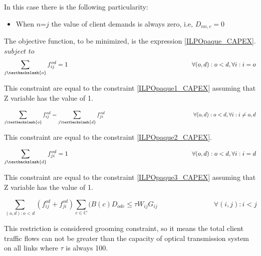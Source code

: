 \vspace{11pt}
In this case there is the following particularity:

\begin{itemize}
  \item When $n$=$j$ the value of client demands is always zero, i.e, $D_{nn,c}=0$
\end{itemize}


\vspace{17pt}
The objective function, to be minimized, is the expression \ref{ILPOpaque_CAPEX}.\\

$subject$ $to$
\begin{equation}
\sum_{j\textbackslash \{o\}} f_{ij}^{od} = 1  \qquad \qquad \qquad \qquad \qquad \qquad \qquad \qquad \qquad \qquad
\forall(o,d) : o < d, \forall i: i = o
\label{ILPOpaque1_Surv}
\end{equation}

This constraint are equal to the constraint \ref{ILPOpaque1_CAPEX} assuming that Z variable has the value of 1.

\begin{equation}
\sum_{j\textbackslash \{o\}} f_{ij}^{od} = \sum_{j\textbackslash \{d\}} f_{ji}^{od}   \qquad \qquad \qquad \qquad \qquad \qquad \qquad \qquad
\forall(o,d) : o < d, \forall i: i \neq o,d
\label{ILPOpaque2_Surv}
\end{equation}

This constraint are equal to the constraint \ref{ILPOpaque2_CAPEX}.

\begin{equation}
\sum_{j\textbackslash \{d\}} f_{ji}^{od} = 1  \qquad \qquad \qquad \qquad \qquad \qquad \qquad \qquad \qquad \qquad
\forall(o,d) : o < d, \forall i: i = d
\label{ILPOpaque3_Surv}
\end{equation}

This constraint are equal to the constraint \ref{ILPOpaque3_CAPEX} assuming that Z variable has the value of 1.

\begin{equation}
\sum_{(o,d):o<d} \left(f_{ij}^{od} + f_{ji}^{od}\right) \sum_{c\in C} (B\left(c\right) D_{odc}\leq \tau W_{ij} G_{ij} \qquad \qquad \qquad \qquad
\forall(i,j) : i < j
\label{ILPOpaque4_Surv}
\end{equation}

This restriction is considered grooming constraint, so it means the total client traffic flows can not be greater than the capacity of optical transmission system on all links where $\tau$ is always 100.

